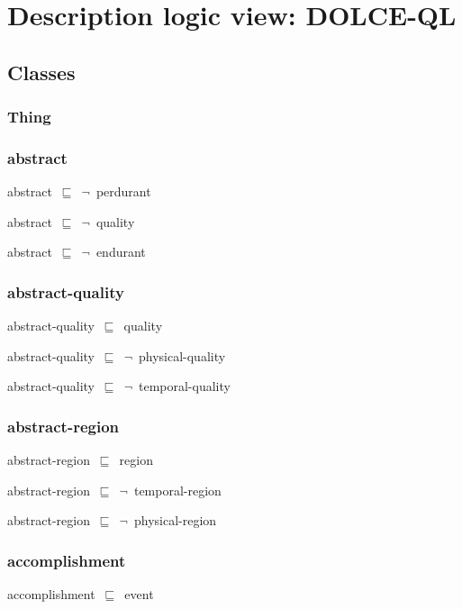 \documentclass{article}
\begin{document}
\section*{Description logic view: DOLCE-QL}

\subsection*{Classes}

\subsubsection*{Thing}

\subsubsection*{abstract}

abstract~\ensuremath{\sqsubseteq}~\ensuremath{\lnot}~perdurant

abstract~\ensuremath{\sqsubseteq}~\ensuremath{\lnot}~quality

abstract~\ensuremath{\sqsubseteq}~\ensuremath{\lnot}~endurant

\subsubsection*{abstract-quality}

abstract-quality~\ensuremath{\sqsubseteq}~quality~

abstract-quality~\ensuremath{\sqsubseteq}~\ensuremath{\lnot}~physical-quality

abstract-quality~\ensuremath{\sqsubseteq}~\ensuremath{\lnot}~temporal-quality

\subsubsection*{abstract-region}

abstract-region~\ensuremath{\sqsubseteq}~region~

abstract-region~\ensuremath{\sqsubseteq}~\ensuremath{\lnot}~temporal-region

abstract-region~\ensuremath{\sqsubseteq}~\ensuremath{\lnot}~physical-region

\subsubsection*{accomplishment}

accomplishment~\ensuremath{\sqsubseteq}~event~
\end{document}
